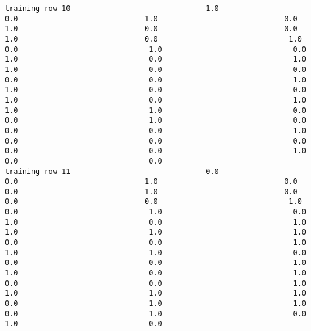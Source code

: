 \documentclass[11pt]{article}
\begin{document}
\begin{verbatim}
training row 10                               1.0                             0.0                             1.0                             0.0                             1.0                             0.0                             0.0                             1.0                             0.0                              1.0                              0.0                              1.0                              0.0                              1.0                              0.0                              1.0                              1.0                              0.0                              0.0                              0.0                              0.0                              1.0                              1.0                              0.0                              0.0                              1.0                              0.0                              1.0                              1.0                              1.0                              0.0                              0.0                              1.0                              0.0                              0.0                              0.0                              1.0                              0.0                              0.0                              0.0                              0.0                              0.0                              1.0                              0.0                              0.0
training row 11                               0.0                             0.0                             1.0                             0.0                             0.0                             1.0                             0.0                             0.0                             0.0                              1.0                              0.0                              1.0                              0.0                              1.0                              0.0                              1.0                              1.0                              1.0                              1.0                              0.0                              0.0                              1.0                              1.0                              1.0                              0.0                              0.0                              0.0                              1.0                              1.0                              0.0                              1.0                              0.0                              0.0                              1.0                              1.0                              1.0                              1.0                              0.0                              1.0                              1.0                              0.0                              1.0                              0.0                              1.0                              0.0

\end{verbatim}
\end{document}
